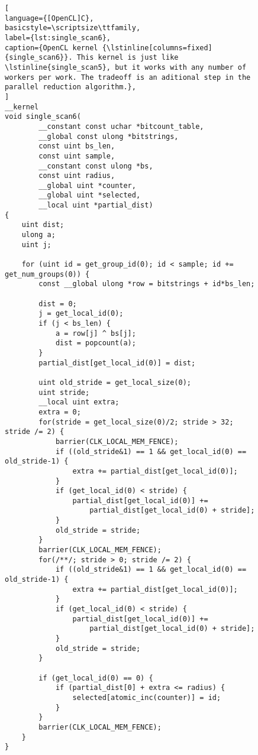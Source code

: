 \begin{figure}[!p]
\begin{lstlisting}[
language={[OpenCL]C},
basicstyle=\scriptsize\ttfamily,
label={lst:single_scan6},
caption={OpenCL kernel {\lstinline[columns=fixed]{single_scan6}}. This kernel is just like \lstinline{single_scan5}, but it works with any number of workers per work. The tradeoff is an aditional step in the parallel reduction algorithm.},
]
__kernel
void single_scan6(
        __constant const uchar *bitcount_table,
        __global const ulong *bitstrings,
        const uint bs_len,
        const uint sample,
        __constant const ulong *bs,
        const uint radius,
        __global uint *counter,
        __global uint *selected,
        __local uint *partial_dist)
{
    uint dist;
    ulong a;
    uint j;

    for (uint id = get_group_id(0); id < sample; id += get_num_groups(0)) {
        const __global ulong *row = bitstrings + id*bs_len;

        dist = 0;
        j = get_local_id(0);
        if (j < bs_len) {
            a = row[j] ^ bs[j];
            dist = popcount(a);
        }
        partial_dist[get_local_id(0)] = dist;

        uint old_stride = get_local_size(0);
        uint stride;
        __local uint extra;
        extra = 0;
        for(stride = get_local_size(0)/2; stride > 32; stride /= 2) {
            barrier(CLK_LOCAL_MEM_FENCE);
            if ((old_stride&1) == 1 && get_local_id(0) == old_stride-1) {
                extra += partial_dist[get_local_id(0)];
            }
            if (get_local_id(0) < stride) {
                partial_dist[get_local_id(0)] +=
                    partial_dist[get_local_id(0) + stride];
            }
            old_stride = stride;
        }
        barrier(CLK_LOCAL_MEM_FENCE);
        for(/**/; stride > 0; stride /= 2) {
            if ((old_stride&1) == 1 && get_local_id(0) == old_stride-1) {
                extra += partial_dist[get_local_id(0)];
            }
            if (get_local_id(0) < stride) {
                partial_dist[get_local_id(0)] +=
                    partial_dist[get_local_id(0) + stride];
            }
            old_stride = stride;
        }

        if (get_local_id(0) == 0) {
            if (partial_dist[0] + extra <= radius) {
                selected[atomic_inc(counter)] = id;
            }
        }
        barrier(CLK_LOCAL_MEM_FENCE);
    }
}
\end{lstlisting}
\end{figure}

